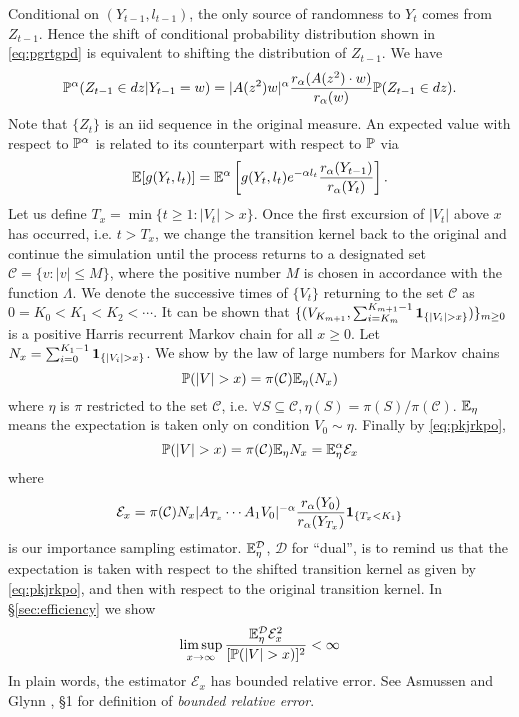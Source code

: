 Conditional on $(Y_{t-1}, l_{t-1})$, the only source of randomness to
$Y_t$ comes from $Z_{t-1}$. Hence the shift of conditional probability
distribution shown in \eqref{eq:pgrtgpd} is equivalent to shifting the
distribution of $Z_{t-1}$. We have
\[
\P^\alpha (Z_{t-1} \in dz | Y_{t-1} = w) = |A(z^2) w|^\alpha {
  r_\alpha(A(z^2) \cdot w) \over r_\alpha(w)
} \P(Z_{t-1} \in dz).
\]
Note that $\{Z_t\}$ is an iid sequence in the original measure.
An expected value with respect to $\P^\alpha$ is related to its
counterpart with respect to $\P$ via
\begin{equation}
  \label{eq:pkjrkpo}
  \E [g(Y_t, l_t)] = \E^\alpha \left[
    g(Y_t, l_t) e^{-\alpha l_t} {r_\alpha(Y_{t-1}) \over r_\alpha(Y_t)}
    \right].
\end{equation}
Let us define $T_x = \min\{t \geq 1: |V_t| > x\}$. 
Once the first excursion of $|V_t|$ above $x$ has occurred, i.e.
$t > T_x$, we change the transition kernel back to the original and
continue the simulation until the process returns to a designated set
$\mathcal C = \{v: |v| \leq M\}$, where
the positive number $M$ is chosen in accordance with the function
$\Lambda$. We denote the successive times of $\{V_t\}$ returning to the
set $\mathcal C$ as $0 = K_0  < K_1 < K_2 < \cdots$. It can be shown that
$\{(V_{K_{m+1}}, \sum_{i=K_m}^{K_{m+1} - 1} \1{|V_i| > x})\}_{m \geq 0}$
is a positive Harris recurrent Markov chain for all $x \geq 0$.
Let $N_x = \sum_{i=0}^{K_1 - 1} \1{|V_i| > x}$. We show by the law of large
numbers for Markov chains
\[
\P(|V| > x) = \pi(\mathcal C) \E_\eta(N_x)
\]
where $\eta$ is $\pi$ restricted to the set $\mathcal C$, i.e.
$\forall S \subseteq \mathcal C, \eta(S) = \pi(S)/\pi(\mathcal C)$.
$\E_\eta$ means the expectation is taken only on condition
$V_0 \sim \eta$. Finally by \eqref{eq:pkjrkpo},
\[
\P(|V| > x) = \pi(\mathcal C) \E_\eta N_x = \E_\eta^{\alpha} \mathcal E_x
\]
where
\[
\mathcal E_x
=
\pi(\mathcal C)
N_x |A_{T_x} \cdots A_1 V_0|^{-\alpha}
{r_\alpha(Y_0) \over r_\alpha(Y_{T_x})}
\1{T_x < K_1}
\]
is our importance sampling estimator. $\E_\eta^{\mathcal D}$,
$\mathcal D$ for ``dual'', is to remind us that the expectation is
taken with respect to the shifted transition kernel as given by
\eqref{eq:pkjrkpo}, and then with respect to the original transition
kernel. In \S\ref{sec:efficiency} we show
\[
\limsup_{x \to \infty} {
  \E_\eta^{\mathcal D} \mathcal E_x^2
  \over
  [\P(|V| > x)]^2
} < \infty
\]
In plain words, the estimator $\mathcal E_x$ has bounded relative
error. See Asmussen and Glynn \cite{opac-b1123521}, \S 1 for
definition of {\em bounded relative error}.
